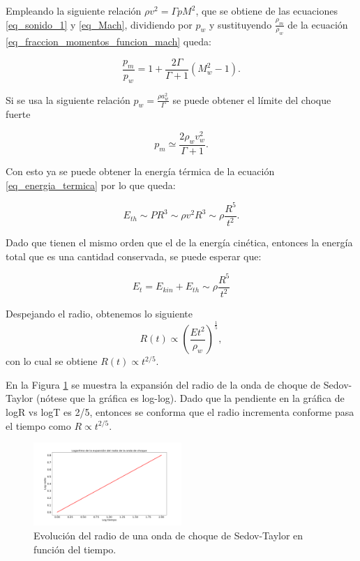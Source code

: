 \documentclass[12pt,a4paper]{book}
\begin{document}
\noindent Empleando la siguiente relación $\rho v^2 = \Gamma p M^2$, que se obtiene de las ecuaciones \ref{eq_sonido_1} y \ref{eq_Mach}, dividiendo por $p_w$ y sustituyendo  $\frac{\rho_m}{\rho_w}$ de la ecuación \ref{eq_fraccion_momentos_funcion_mach} queda:

\begin{equation} \label{eq_fraccion_Presiones}
  \frac{p_m}{p_w} = 1 + \frac{2 \Gamma}{\Gamma + 1} \left( M_w^2 -1\right).
\end{equation}

\noindent Si se usa la siguiente relación $ p_w = \frac{\rho a_w^2 }{\Gamma}$ se puede obtener el límite del choque fuerte

\begin{equation}
  p_m  \simeq \frac{2 \rho_w v_w^2}{\Gamma + 1}.
\end{equation}

\noindent Con esto ya se puede obtener la energía térmica de la ecuación \ref{eq_energia_termica} por lo que queda: 

\begin{equation}
  E_{th} \sim P R^3 \sim \rho v^2 R^3 \sim \rho \frac{R^5}{t^2}.
\end{equation}

\noindent Dado que tienen el mismo orden que el de la energía cinética, entonces la energía total que es una cantidad conservada, se puede esperar que:

\begin{equation}
  E_t = E_{kin} + E_{th} \sim \rho \frac{R^5}{t^2}
\end{equation}

\noindent Despejando el radio, obtenemos lo siguiente
\begin{equation} \label{eq_Radio_proporcional}
  R(t) \varpropto \left(\frac{E t^2}{\rho_w}\right)^{\frac{1}{5}},
\end{equation}
con lo cual se obtiene $R(t) \varpropto t^{2/5}$.

En la Figura \ref{fig_Radio_v_tiempo} se muestra la expansión del radio de la onda de choque de Sedov-Taylor (nótese que la gráfica es log-log). Dado que la pendiente en la gráfica de logR vs logT es 2/5, entonces se conforma que el radio incrementa conforme pasa el tiempo como $R \propto t^{2/5}$.

\begin{figure}
  \centering
    \includegraphics[width=0.5\textwidth]{Figuras/capitulo_2/Radio_vs_tiempo.png}
  \caption{Evolución del radio de una onda de choque de Sedov-Taylor en función del tiempo.} \label{fig_Radio_v_tiempo}
\end{figure}
\end{document}
